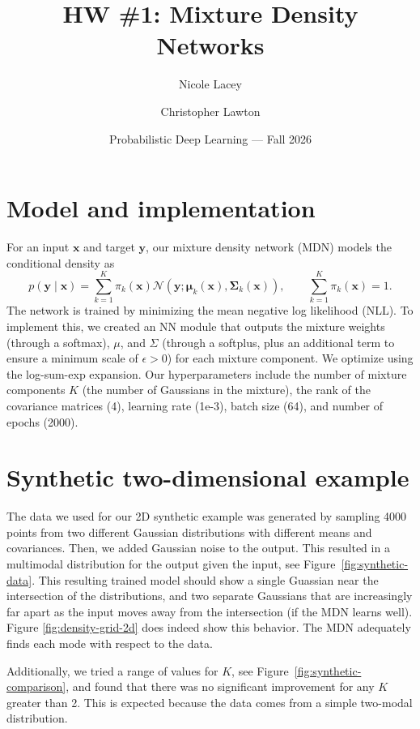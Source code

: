 \documentclass[10pt]{article}
\title{HW \#1: Mixture Density Networks}
\author{Nicole Lacey \and Christopher Lawton}
\date{Probabilistic Deep Learning --- Fall 2026}
\begin{document}
\maketitle
\vspace{-2.2em}


\section{Model and implementation}

For an input $\mathbf{x}$ and target $\mathbf{y}$, our mixture density network
(MDN) models the conditional density as
\begin{equation}
  p(\mathbf{y}\mid\mathbf{x}) =
  \sum_{k=1}^{K}\pi_k(\mathbf{x})
  \mathcal{N}\!\left(\mathbf{y};\boldsymbol{\mu}_k(\mathbf{x}),
  \boldsymbol{\Sigma}_k(\mathbf{x})\right),
  \qquad \sum_{k=1}^{K}\pi_k(\mathbf{x})=1.
\end{equation}
The network is trained by minimizing the mean negative log likelihood (NLL).
To implement this, we created an NN module that outputs the mixture weights (through a softmax), $\mu$, and $\Sigma$ (through a softplus, plus an additional term to ensure a minimum scale of $\epsilon>0$) for each mixture component. We optimize using the log-sum-exp expansion. Our hyperparameters include the number of mixture components $K$ (the number of Gaussians in the mixture), the rank of the covariance matrices (4), learning rate (1e-3), batch size (64), and number of epochs (2000). 

\section{Synthetic two-dimensional example}
The data we used for our 2D synthetic example was generated by sampling 4000 points from two different Gaussian distributions with different means and covariances. Then, we added Gaussian noise to the output. This resulted in a multimodal distribution for the output given the input, see Figure~\ref{fig:synthetic-data}. This resulting trained model should show a single Guassian near the intersection of the distributions, and two separate Gaussians that are increasingly far apart as the input moves away from the intersection (if the MDN learns well). Figure \ref{fig:density-grid-2d} does indeed show this behavior. The MDN adequately finds each mode with respect to the data.

Additionally, we tried a range of values for $K$, see Figure~\ref{fig:synthetic-comparison}, and found that there was no significant improvement for any $K$ greater than 2. This is expected because the data comes from a simple two-modal distribution.
\end{document}

